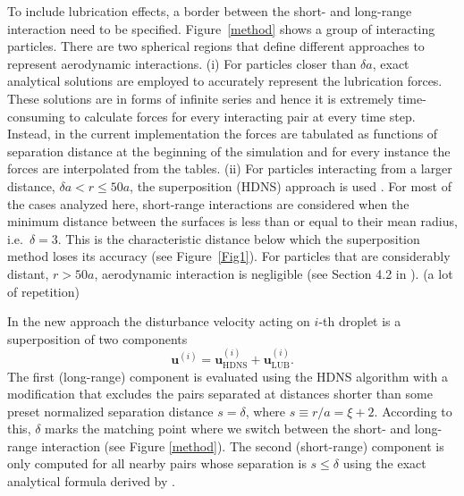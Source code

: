 \documentclass[../thesis.tex]{subfiles}
\begin{document}
To include lubrication effects, a border between the short- and long-range interaction need to be specified. Figure~\ref{method} shows a group of interacting particles. There are two spherical regions that define different approaches to represent aerodynamic interactions. (i) For particles closer than $\delta a$, exact analytical solutions \cite{JO84} are employed to accurately represent the lubrication forces. These solutions are in forms of infinite series and hence it is extremely time-consuming to calculate forces for every interacting pair at every time step. Instead, in the current implementation the forces are tabulated as functions of separation distance at the beginning of the simulation and for every instance the forces are interpolated from the tables. (ii) For particles interacting from a larger distance, $\delta a < r \leq 50a$, the superposition (HDNS) approach is used \citep{WAG05,AGW07}. For most of the cases analyzed here, short-range interactions \citep{JO84} are considered when the minimum distance between the surfaces is less than or equal to their mean radius, i.e.~$\delta=3$. This is the characteristic distance below which the superposition method loses its accuracy (see Figure~\ref{Fig1}). For particles that are considerably distant, $r>50a$, aerodynamic interaction is negligible (see Section 4.2 in \cite{AGW07}). (a lot of repetition)

In the new approach the disturbance velocity acting on $i$-th droplet is a superposition of two components
\begin{equation}
\boldsymbol{u}^{(i)}
=
\boldsymbol{u}^{(i)}_{\text{HDNS}} + \boldsymbol{u}^{(i)}_{\text{LUB}}.
\end{equation}
The first (long-range) component is evaluated using the HDNS algorithm with a modification that excludes the pairs separated at distances shorter than some preset normalized separation distance $s = \delta$, where $s \equiv r/a = \xi + 2$. According to this, $\delta$ marks the matching point where we switch between the short- and long-range interaction (see Figure \ref{method}). The second (short-range) component is only computed for all nearby pairs whose separation is $s\le\delta$ using the exact analytical formula derived by \citet{JO84}. 
\end{document}
